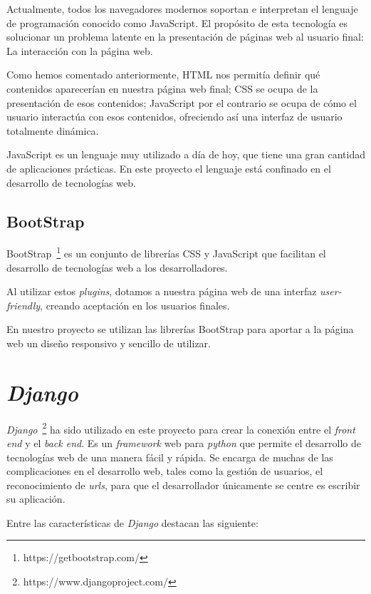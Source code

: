 \documentclass[a4paper, 12pt]{book}
\begin{document}
Actualmente, todos los navegadores modernos soportan e interpretan el lenguaje
de programación conocido como JavaScript. El propósito de esta tecnología es
solucionar un problema latente en la presentación de páginas web al usuario final:
La interacción con la página web.

Como hemos comentado anteriormente, HTML nos permitía definir qué contenidos
aparecerían en nuestra página web final; CSS se ocupa de la presentación de 
esos contenidos; JavaScript por el contrario se ocupa de cómo el usuario interactúa
con esos contenidos, ofreciendo así una interfaz de usuario totalmente
dinámica.

JavaScript es un lenguaje muy utilizado a día de hoy, que tiene una gran
cantidad de aplicaciones prácticas. En este proyecto el lenguaje está
confinado en el desarrollo de tecnologías web.

\subsection{BootStrap}
\label{subsec:bootstrap}

BootStrap~\footnote{https://getbootstrap.com/} es un conjunto de librerías
CSS y JavaScript que facilitan el desarrollo de tecnologías web a los
desarrolladores.

Al utilizar estos \textit{plugins}, dotamos a nuestra página web de una interfaz
\textit{user-friendly}, creando aceptación en los usuarios finales.

En nuestro proyecto se utilizan las librerías BootStrap para aportar
a la página web un diseño responsivo y sencillo de utilizar.

\section{\textit{Django}} 
\label{sec:django}

\textit{Django}~\footnote{https://www.djangoproject.com/} ha sido utilizado en este
proyecto para crear la conexión entre el \textit{front end} y el
\textit{back end}. Es un \textit{framework} web para \textit{python} que permite el
desarrollo de tecnologías web de una manera fácil y rápida. Se encarga de
muchas de las complicaciones en el desarrollo web, tales como la gestión
de usuarios, el reconocimiento de \textit{urls}, para que el desarrollador
únicamente se centre es escribir su aplicación.

Entre las características de \textit{Django} destacan las siguiente:
\end{document}
